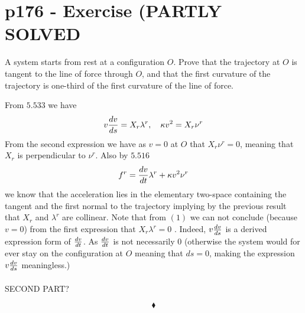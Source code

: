 \section{p176 - Exercise (PARTLY SOLVED}
\begin{tcolorbox}
A system starts from rest at a configuration $O$. Prove that the trajectory at $O$ is tangent to the line of force through $O$, and that the first curvature of the trajectory is one-third of the first curvature of the line of force.
\end{tcolorbox}
From $\mathbf{5.533}$ we have 
\begin{align}
v\dv{v}{s}= X_r\lambda^r, \quad \kappa v^2=X_r\nu^r
\end{align}
From the second expression we have as $v=0$ at $O$ that $X_r\nu^r=0$, meaning that $X_r$ is perpendicular to $\nu^r$.
Also by $\mathbf{5.516}$
\begin{align}
f^r = \dv{v}{t}\lambda^r + \kappa v^2 \nu^r
\end{align}
we know that the acceleration lies in the elementary two-space containing the tangent and the first normal to the trajectory implying by the previous result that $X_r$ and $\lambda^r$ are collinear.
Note that from $(1)$ we can not conclude (because $v=0$) from the first expression  that $X_r\lambda^r=0$ . Indeed, $v\dv{v}{s}$ is a derived expression form of $\dv{v}{t}$. As $\dv{v}{t}$ is not necessarily $0$ (otherwise the system would for ever  stay on the configuration at $O$ meaning that $ds=0$, making the expression $v\dv{v}{s}$ meaningless.)
\\\\
SECOND PART?


$$\blacklozenge$$
\newpage


